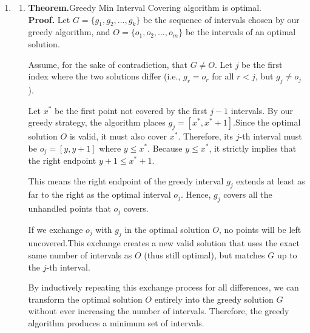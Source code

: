 \documentclass[12pt,a4paper]{article}
\makeatletter
\newtheorem*{solution}{Solution}
\theoremstyle{definition}
\renewenvironment{solution}[1][Solution]
{\par\pushQED{\qed}\normalfont\topsep6\p@\@plus6\p@\relax\trivlist
\item[\hskip\labelsep\bfseries#1\@addpunct{.}]\ignorespaces}{\popQED\endtrivlist\@endpefalse}
\makeatother
\begin{document}
\begin{enumerate}
\begin{solution}
\begin{enumerate}
            \item
            \textbf{Theorem.}Greedy Min Interval Covering algorithm is optimal.\\
            \textbf{Proof.}
                Let $G = \{g_1, g_2, \ldots, g_k\}$ be the sequence of intervals chosen by our greedy algorithm, and $O = \{o_1, o_2, \ldots, o_m\}$ be the intervals of an optimal solution.
        
                Assume, for the sake of contradiction, that $G \neq O$. Let $j$ be the first index where the two solutions differ (i.e., $g_r = o_r$ for all $r < j$, but $g_j \neq o_j$). 
                
                Let $x^*$ be the first point not covered by the first $j-1$ intervals. By our greedy strategy, the algorithm places $g_j = [x^*, x^* + 1]$.Since the optimal solution $O$ is valid, it must also cover $x^*$. Therefore, its $j$-th interval must be $o_j = [y, y + 1]$ where $y \leq x^*$. Because $y \leq x^*$, it strictly implies that the right endpoint $y + 1 \leq x^* + 1$. 
                
                This means the right endpoint of the greedy interval $g_j$ extends at least as far to the right as the optimal interval $o_j$. Hence, $g_j$ covers all the unhandled points that $o_j$ covers. 
                
                If we exchange $o_j$ with $g_j$ in the optimal solution $O$, no points will be left uncovered.This exchange creates a new valid solution that uses the exact same number of intervals as $O$ (thus still optimal), but matches $G$ up to the $j$-th interval.
                
                By inductively repeating this exchange process for all differences, we can transform the optimal solution $O$ entirely into the greedy solution $G$ without ever increasing the number of intervals. Therefore, the greedy algorithm produces a minimum set of intervals.
            
        \end{enumerate}
    \end{solution}



\end{enumerate}
\end{document}
